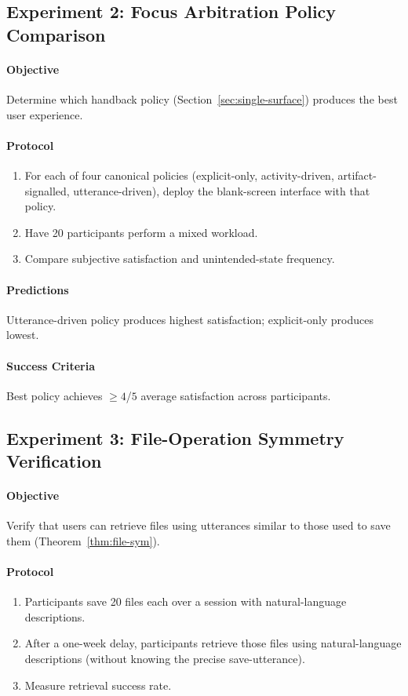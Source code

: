 \documentclass[11pt,a4paper]{article}
\theoremstyle{definition}
\theoremstyle{remark}
\begin{document}
\subsection{Experiment 2: Focus Arbitration Policy Comparison}

\paragraph{Objective} Determine which handback policy (Section~\ref{sec:single-surface}) produces the best user experience.

\paragraph{Protocol}
\begin{enumerate}
    \item For each of four canonical policies (explicit-only, activity-driven, artifact-signalled, utterance-driven), deploy the blank-screen interface with that policy.
    \item Have 20 participants perform a mixed workload.
    \item Compare subjective satisfaction and unintended-state frequency.
\end{enumerate}

\paragraph{Predictions}
Utterance-driven policy produces highest satisfaction; explicit-only produces lowest.

\paragraph{Success Criteria}
Best policy achieves $\geq 4$/$5$ average satisfaction across participants.

\subsection{Experiment 3: File-Operation Symmetry Verification}

\paragraph{Objective} Verify that users can retrieve files using utterances similar to those used to save them (Theorem~\ref{thm:file-sym}).

\paragraph{Protocol}
\begin{enumerate}
    \item Participants save 20 files each over a session with natural-language descriptions.
    \item After a one-week delay, participants retrieve those files using natural-language descriptions (without knowing the precise save-utterance).
    \item Measure retrieval success rate.
\end{enumerate}
\end{document}

